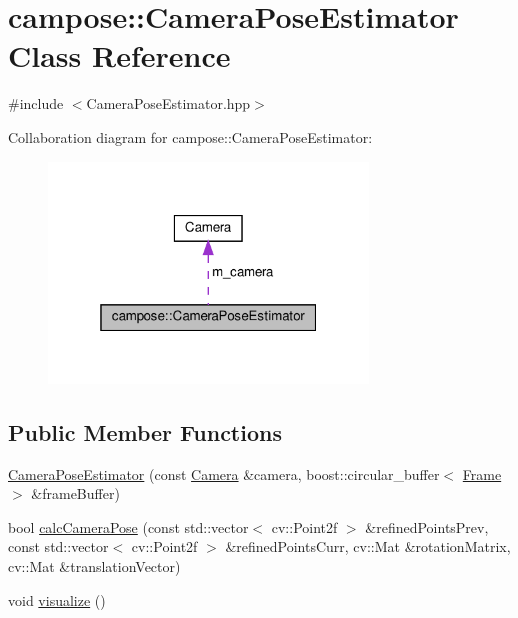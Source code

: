 \hypertarget{classcampose_1_1CameraPoseEstimator}{}\section{campose\+:\+:Camera\+Pose\+Estimator Class Reference}
\label{classcampose_1_1CameraPoseEstimator}


{\ttfamily \#include $<$Camera\+Pose\+Estimator.\+hpp$>$}



Collaboration diagram for campose\+:\+:Camera\+Pose\+Estimator\+:\nopagebreak
\begin{figure}[H]
\begin{center}
\leavevmode
\includegraphics[width=241pt]{classcampose_1_1CameraPoseEstimator__coll__graph}
\end{center}
\end{figure}
\subsection*{Public Member Functions}
\begin{DoxyCompactItemize}
\item 
\hyperlink{classcampose_1_1CameraPoseEstimator_ac2e15d64ea58fbb2fe08b575a599a280}{Camera\+Pose\+Estimator} (const \hyperlink{classCamera}{Camera} \&camera, boost\+::circular\+\_\+buffer$<$ \hyperlink{classFrame}{Frame} $>$ \&frame\+Buffer)
\item 
bool \hyperlink{classcampose_1_1CameraPoseEstimator_a975c193e745e9150f0726e188a2daa1e}{calc\+Camera\+Pose} (const std\+::vector$<$ cv\+::\+Point2f $>$ \&refined\+Points\+Prev, const std\+::vector$<$ cv\+::\+Point2f $>$ \&refined\+Points\+Curr, cv\+::\+Mat \&rotation\+Matrix, cv\+::\+Mat \&translation\+Vector)
\item 
void \hyperlink{classcampose_1_1CameraPoseEstimator_ac1b95d78d7d3f4c8032d8e494034420c}{visualize} ()
\end{DoxyCompactItemize}
